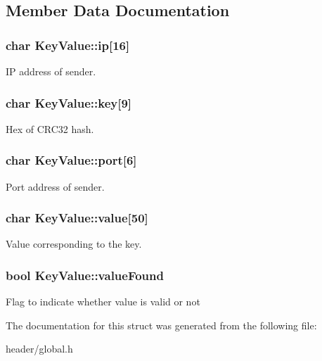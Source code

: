 \subsection{Member Data Documentation}
\hypertarget{structKeyValue_a925635eab00a78fd446a3c55c309b7f3}{
\subsubsection[{ip}]{\setlength{\rightskip}{0pt plus 5cm}char Key\-Value\-::ip\mbox{[}16\mbox{]}}}\label{structKeyValue_a925635eab00a78fd446a3c55c309b7f3}
I\-P address of sender. \hypertarget{structKeyValue_ad568ca57153492fd17469a5da9c53bf7}{
\subsubsection[{key}]{\setlength{\rightskip}{0pt plus 5cm}char Key\-Value\-::key\mbox{[}9\mbox{]}}}\label{structKeyValue_ad568ca57153492fd17469a5da9c53bf7}
Hex of C\-R\-C32 hash. \hypertarget{structKeyValue_a888b790a99542bbeaa2533adb59bf1ae}{
\subsubsection[{port}]{\setlength{\rightskip}{0pt plus 5cm}char Key\-Value\-::port\mbox{[}6\mbox{]}}}\label{structKeyValue_a888b790a99542bbeaa2533adb59bf1ae}
Port address of sender. \hypertarget{structKeyValue_aecdacf280bd6aaba9bde2ab8be9bc8d6}{
\subsubsection[{value}]{\setlength{\rightskip}{0pt plus 5cm}char Key\-Value\-::value\mbox{[}50\mbox{]}}}\label{structKeyValue_aecdacf280bd6aaba9bde2ab8be9bc8d6}
Value corresponding to the key. \hypertarget{structKeyValue_afbdc219b834bb70070e683b96e80a7d4}{
\subsubsection[{value\-Found}]{\setlength{\rightskip}{0pt plus 5cm}bool Key\-Value\-::value\-Found}}\label{structKeyValue_afbdc219b834bb70070e683b96e80a7d4}
Flag to indicate whether value is valid or not 

The documentation for this struct was generated from the following file\-:\begin{DoxyCompactItemize}
\item 
header/global.\-h\end{DoxyCompactItemize}
